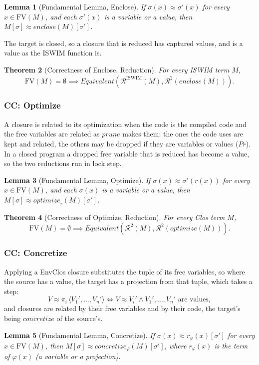 \documentclass[10pt]{article}
\theoremstyle{acmplain}
\newtheorem{theorem}{Theorem}[section]
\newtheorem{lemma}[theorem]{Lemma}
\newcommand{\pass}[1]{\mathit{#1}}
\newcommand{\tuple}[1]{\langle #1 \rangle}
\newcommand{\prj}[1]{\pi_{#1}\,}
\newcommand{\FV}{\mathrm{FV}}
\newcommand{\Equiv}{\mathit{Equivalent}}
\begin{document}
\begin{lemma}[Fundamental Lemma, Enclose]
If $\sigma(x) \approx \sigma'(x)$ for every $x \in \FV(M)$, and each
$\sigma'(x)$ is a variable or a value, then $M[\sigma] \approx \pass{enclose}(M)[\sigma']$.
\end{lemma}

The target is closed, so a closure that is reduced has captured values,
and is a value as the ISWIM function is.

\begin{theorem}[Correctness of Enclose, Reduction]\label{thm:enclose-red}
For every ISWIM term $M$,
\[
  \FV(M) = \emptyset \implies
  \Equiv(\mathcal{R}^{\mathrm{ISWIM}}(M), \mathcal{R}^{2}(\pass{enclose}(M))) .
\]
\end{theorem}

\subsubsection{CC: Optimize}

A closure is related to its optimization when the code is the compiled code
and the free variables are related as $\pass{prune}$ makes them: the ones the
code uses are kept and related, the others may be dropped if they are
variables or values ($\mathit{Pr}$). In a closed program a dropped free
variable that is reduced has become a value, so the two reductions run in
lock step.
\begin{lemma}[Fundamental Lemma, Optimize]
If $\sigma(x) \approx \sigma'(r(x))$ for every $x \in \FV(M)$, and each
$\sigma(x)$ is a variable or a value, then $M[\sigma] \approx \pass{optimize}_r(M)[\sigma']$.
\end{lemma}

\begin{theorem}[Correctness of Optimize, Reduction]\label{thm:optimize-red}
For every Clos term $M$,
\[
  \FV(M) = \emptyset \implies \Equiv(\mathcal{R}^{2}(M), \mathcal{R}^{2}(\pass{optimize}(M))) .
\]
\end{theorem}

\subsubsection{CC: Concretize}

Applying a EnvClos closure substitutes the tuple of its free variables, so where
the source has a value, the target has a projection from that tuple, which
takes a step:
\[
  V \approx \prj{i} \tuple{V_1', \ldots, V_n'} \iff V \approx V_i' \land V_1', \ldots, V_n' \text{ are values} ,
\]
and closures are related by their free variables and by their code, the
target's being $\pass{concretize}$ of the source's.
\begin{lemma}[Fundamental Lemma, Concretize]
If $\sigma(x) \approx r_\varphi(x)[\sigma']$ for every $x \in \FV(M)$, then
$M[\sigma] \approx \pass{concretize}_\varphi(M)[\sigma']$, where $r_\varphi(x)$
is the term of $\varphi(x)$ (a variable or a projection).
\end{lemma}
\end{document}
